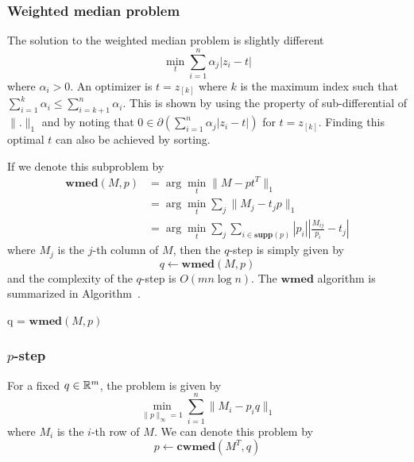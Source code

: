 \subsubsection{Weighted median problem}
The solution to the weighted median problem is slightly different
\[
\min_t \sum_{i = 1}^n \alpha_j |z_i - t|
\]
where $\alpha_i > 0$. An optimizer is $t = z_{[k]}$ where $k$ is the maximum index such that $\sum_{i = 1}^k \alpha_i \leq \sum_{i = k+1}^n \alpha_i$.  This is shown by using the property of sub-differential of $\|.\|_{1}$ and by noting that $0 \in \partial (\sum_{i = 1}^n \alpha_j |z_i - t|)$ for $t = z_{[k]}$. Finding this optimal $t$ can also be achieved by sorting.

If we denote this subproblem by
\begin{align*}
\mathbf{wmed}(M, p) 
&= \arg \min_t \|M - pt^T\|_1 \\
&= \arg \min_t \sum_{j} \|M_j - t_jp\|_1 \\
&= \arg \min_t \sum_{j} \sum_{i \in \mathbf{supp}(p)} |p_i| \left| \frac{M_{ij}}{p_i} - t_j \right|
\end{align*}
where $M_j$ is the $j$-th column of $M$, then the $q$-step is simply given by
\[
q \leftarrow \mathbf{wmed}(M, p) 
\]
and the complexity of the $q$-step is $O(mn\log n)$. The $\mathbf{wmed}$ algorithm is summarized in Algorithm~\cite{wmhalgo}.
%
\begin{algorithm}[h]
\caption{q = $\mathbf{wmed}(M,p)$}
\label{wmhalgo}
\end{algorithm}

\subsubsection{$p$-step} 
For a fixed $q \in {\mathbb R}^m$, the problem is given by
\[
\min_{\|p\|_\infty = 1} \sum_{i = 1}^n \|M_i - p_i q\|_1
\]
where $M_i$ is the $i$-th row of $M$. We can denote this problem by
\[
p \leftarrow \mathbf{cwmed}(M^T, q)
\]

